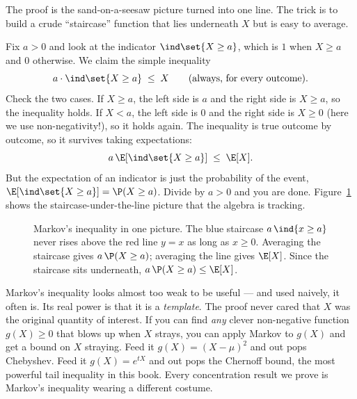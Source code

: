 \begin{whybox}
The proof is the sand-on-a-seesaw picture turned into one line. The trick is to
build a crude ``staircase'' function that lies underneath $X$ but is easy to
average.

Fix $a>0$ and look at the indicator $\ind\set{X \ge a}$, which is $1$ when
$X \ge a$ and $0$ otherwise. We claim the simple inequality
\[
  a \cdot \ind\set{X \ge a} \;\le\; X
  \qquad \text{(always, for every outcome).}
\]
Check the two cases. If $X \ge a$, the left side is $a$ and the right side is
$X \ge a$, so the inequality holds. If $X < a$, the left side is $0$ and the
right side is $X \ge 0$ (here we use non-negativity!), so it holds again. The
inequality is true outcome by outcome, so it survives taking expectations:
\[
  a\,\E\!\left[\ind\set{X\ge a}\right] \;\le\; \E[X].
\]
But the expectation of an indicator is just the probability of the event,
$\E[\ind\set{X\ge a}] = \P(X\ge a)$. Divide by $a>0$ and you are done.
Figure~\ref{ch19:fig-markov} shows the staircase-under-the-line picture that
the algebra is tracking.
\end{whybox}

\begin{figure}[H]
\centering
{}
\caption{Markov's inequality in one picture. The blue staircase
$a\,\ind\{x\ge a\}$ never rises above the red line $y=x$ as long as $x\ge 0$.
Averaging the staircase gives $a\,\P(X\ge a)$; averaging the line gives
$\E[X]$. Since the staircase sits underneath, $a\,\P(X\ge a)\le \E[X]$.}
\label{ch19:fig-markov}
\end{figure}

\begin{happeningbox}
Markov's inequality looks almost too weak to be useful --- and used naively,
it often is. Its real power is that it is a \emph{template}. The proof never
cared that $X$ was the original quantity of interest. If you can find
\emph{any} clever non-negative function $g(X) \ge 0$ that blows up when $X$
strays, you can apply Markov to $g(X)$ and get a bound on $X$ straying. Feed
it $g(X) = (X-\mu)^2$ and out pops Chebyshev. Feed it
$g(X) = e^{tX}$ and out pops the Chernoff bound, the most powerful tail
inequality in this book. Every concentration result we prove is Markov's
inequality wearing a different costume.
\end{happeningbox}

